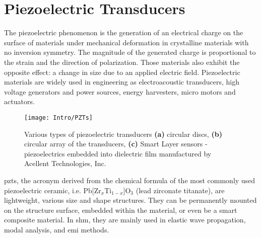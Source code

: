 \section{Piezoelectric Transducers}
\label{sec:PZT}

The piezoelectric phenomenon is the generation of an electrical charge on the surface of materials under mechanical deformation in crystalline materials with no inversion symmetry.
The magnitude of the generated charge is proportional to the strain and the direction of polarization.
Those materials also exhibit the opposite effect: a change in size due to an applied electric field.
Piezoelectric materials are widely used in engineering as electroacoustic transducers, high voltage generators and power sources, energy harvesters, micro motors and actuators.
\begin{figure}[H]
	\begin{center}
		\texttt{[image: Intro/PZTs]}
	\end{center}
	\caption{Various types of piezoelectric transducers \textbf{(a)} circular discs, \textbf{(b)} circular array of the transducers, \textbf{(c)} Smart Layer\textsuperscript{\tiny\textregistered} sensors - piezoelectrics embedded into dielectric film manufactured by Acellent Technologies, Inc.}
	\label{fig:piezo}
\end{figure}
\Acp{pzt}, the acronym derived from the chemical formula of the most commonly used piezoelectric ceramic, i.e. Pb[Zr\(_x\)Ti\(_{1-x}\)]O\(_3\) (lead zirconate titanate), are lightweight, various size and shape structures. 
They can be permanently mounted on the structure surface, embedded within the material, or even be a smart composite material.
In \ac{shm}, they are mainly used in elastic wave propagation, modal analysis, and \ac{emi} methods.